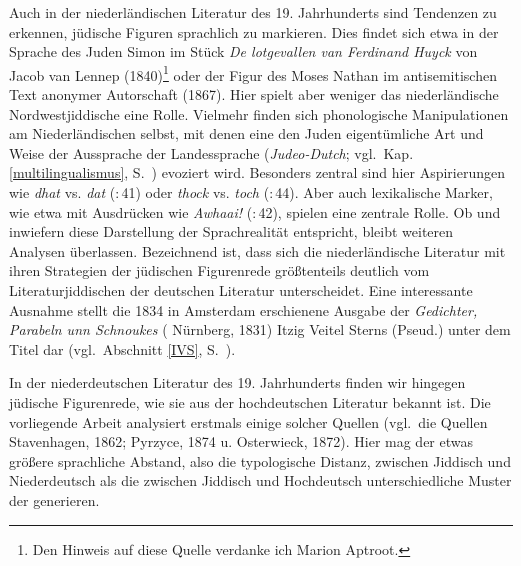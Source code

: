 Auch in der niederländischen Literatur des 19. Jahrhunderts sind Tendenzen zu erkennen, jüdische Figuren sprachlich zu markieren. Dies findet sich etwa in der Sprache des Juden Simon im Stück \textit{De lotgevallen van Ferdinand Huyck} von Jacob van Lennep (1840)\footnote{Den Hinweis auf diese Quelle verdanke ich Marion Aptroot.} oder der Figur des Moses Nathan im antisemitischen Text anonymer Autorschaft  (1867). Hier spielt aber weniger das niederländische Nordwestjiddische eine Rolle. Vielmehr finden sich phonologische Manipulationen am Niederländischen selbst, mit denen eine den Juden eigentümliche Art und Weise der Aussprache der Landessprache (\textit{Judeo-Dutch}; vgl.\, Kap.\, \ref{multilingualismus}, S.\, \pageref{multilingualismus}) evoziert wird. Besonders zentral sind hier Aspirierungen wie \textit{dhat} vs. {\ndl} \textit{dat}  (:\,41) oder \textit{thock} vs. {\ndl} \textit{toch}  (:\,44). Aber auch lexikalische Marker, wie etwa mit Ausdrücken wie \textit{Awhaai!}  (:\,42), spielen eine zentrale Rolle. Ob und inwiefern diese Darstellung der Sprachrealität entspricht, bleibt weiteren Analysen überlassen. Bezeichnend ist, dass sich die niederländische Literatur mit ihren Strategien der jüdischen Figurenrede größtenteils deutlich vom Literaturjiddischen der deutschen Literatur unterscheidet. Eine interessante Ausnahme stellt die 1834 in Amsterdam erschienene Ausgabe der \textit{Gedichter, Parabeln unn Schnoukes} ( Nürnberg, 1831) Itzig Veitel Sterns (Pseud.) unter dem Titel  dar (vgl.\, Abschnitt \ref{IVS}, S.\, \pageref{IVS}).

 
In der niederdeutschen Literatur des 19. Jahrhunderts finden wir hingegen jüdische Figurenrede, wie sie aus der hochdeutschen Literatur bekannt ist. Die vorliegende Arbeit analysiert erstmals einige solcher Quellen (vgl.\, die Quellen  Stavenhagen, 1862;  Pyrzyce, 1874 u.  Osterwieck, 1872). Hier mag der etwas größere sprachliche Abstand, also die typologische Distanz, zwischen Jiddisch und Niederdeutsch als die zwischen Jiddisch und Hochdeutsch unterschiedliche Muster der  generieren.


